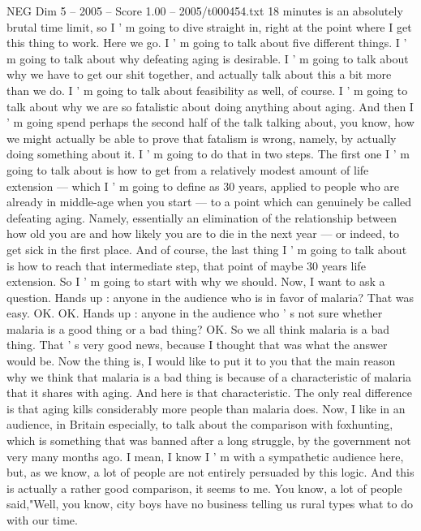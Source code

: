 \begin{textsample}{NEG Dim 5 – 2005 – Score 1.00 – 2005/t000454.txt}  \label{ex:f5_neg_075}
18 minutes is an absolutely brutal time limit, so I ' m going to dive straight in, right at the point where I get this thing to work.
Here we go.
I ' m going to talk about five different things.
I ' m going to talk about why defeating aging is desirable.
I ' m going to talk about why we have to get our shit together, and actually talk about this a bit more than we do.
I ' m going to talk about feasibility as well, of course.
I ' m going to talk about why we are so fatalistic about doing anything about aging.
And then I ' m going spend perhaps the second half of the talk talking about, you know, how we might actually be able to prove that fatalism is wrong, namely, by actually doing something about it.
I ' m going to do that in two steps.
The first one I ' m going to talk about is how to get from a relatively modest amount of life extension — which I ' m going to define as 30 years, applied to people who are already in middle-age when you start — to a point which can genuinely be called defeating aging.
Namely, essentially an elimination of the relationship between how old you are and how likely you are to die in the next year — or indeed, to get sick in the first place.
And of course, the last thing I ' m going to talk about is how to reach that intermediate step, that point of maybe 30 years life extension.
So I ' m going to start with why we should.
Now, I want to ask a question.
Hands up : anyone in the audience who is in favor of malaria?
That was easy.
OK.
OK.
Hands up : anyone in the audience who ' s not sure whether malaria is a good thing or a bad thing?
OK.
So we all think malaria is a bad thing.
That ' s very good news, because I thought that was what the answer would be.
Now the thing is, I would like to put it to you that the main reason why we think that malaria is a bad thing is because of a characteristic of malaria that it shares with aging.
And here is that characteristic.
The only real difference is that aging kills considerably more people than malaria does.
Now, I like in an audience, in Britain especially, to talk about the comparison with foxhunting, which is something that was banned after a long struggle, by the government not very many months ago.
I mean, I know I ' m with a sympathetic audience here, but, as we know, a lot of people are not entirely persuaded by this logic.
And this is actually a rather good comparison, it seems to me.
You know, a lot of people said,"Well, you know, city boys have no business telling us rural types what to do with our time.

\end{textsample}
